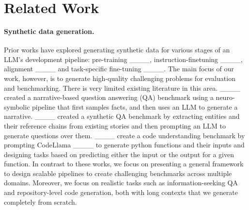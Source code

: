 \section{Related Work}
\paragraph{Synthetic data generation.} Prior works have explored generating synthetic data for various stages of an LLM's development pipeline: pre-training ____, instruction-finetuning ____, alignment ____ and task-specific fine-tuning ____. The main focus of our work, however, is to generate high-quality challenging problems for evaluation and benchmarking. There is very limited existing literature in this area. ____ created a narrative-based question answering (QA) benchmark using a neuro-symbolic pipeline that first samples facts, and then uses an LLM to generate a narrative. ____ created a synthetic QA benchmark by extracting entities and their reference chains from existing stories and then prompting an LLM to generate questions over them. ____ create a code understanding benchmark by prompting CodeLlama ____ to generate python functions and their inputs and designing tasks based on predicting either the input or the output for a given function. In contrast to these works, we focus on presenting a general framework to design scalable pipelines to create challenging benchmarks across multiple domains. Moreover, we focus on realistic tasks such as information-seeking QA and repository-level code generation, both with long contexts that we generate completely from scratch.

